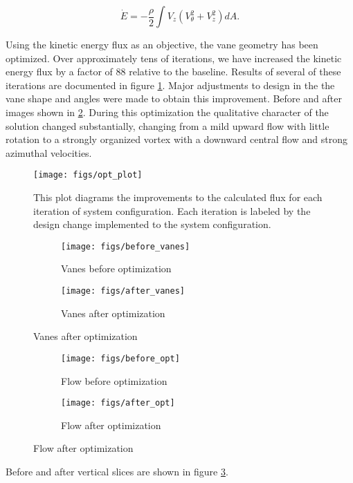 
 \begin{equation}
 \dot E = -\frac{\rho }{2} \int V_z (V_{\theta}^2 + V_z^2 ) dA.
 \end{equation}

Using the kinetic energy flux as an objective, the vane geometry has
been optimized. Over approximately  tens of iterations, we have
increased the kinetic energy flux by  a factor of 88 relative to the
baseline. Results of several of these iterations are documented in
figure \ref{fig:opt_plot}. Major adjustments  to design in the the vane
shape and angles were made to obtain this improvement.  Before and after
images shown in \ref{fig:vt-wind-vert}. During this optimization the
qualitative character of the solution changed substantially, changing
from a mild upward flow with little rotation to a strongly organized
vortex with a downward central flow and strong azimuthal velocities.  

\begin{figure}[htb]
 \centering
 \texttt{[image: figs/opt\_plot]}
 \caption{This plot diagrams the improvements to the calculated flux for  
 each iteration of system configuration. Each iteration is labeled by
 the design change implemented to the system configuration.}
 \label{fig:opt_plot}
\end{figure}


\begin{figure}[htb!]
 \begin{subfigure}{.5\textwidth}
  \centering
  \texttt{[image: figs/before\_vanes]}
  \caption{Vanes before optimization}
 \end{subfigure}%
 \begin{subfigure}{.5\textwidth}
  \centering
  \texttt{[image: figs/after\_vanes]}
  \caption{Vanes after optimization}
 \end{subfigure}%
 \label{fig:vt-wind-vert}
\end{figure}


%
%
\begin{figure}[htb!]
 \begin{subfigure}{.5\textwidth}
  \centering
  \texttt{[image: figs/before\_opt]}
  \caption{Flow before optimization}
 \end{subfigure}%
 \begin{subfigure}{.5\textwidth}
  \centering
  \texttt{[image: figs/after\_opt]}
  \caption{Flow after optimization}
 \end{subfigure}%
  \label{fig:opt_flow}
\end{figure}
%
Before and after vertical slices are shown in figure \ref{fig:opt_flow}.
